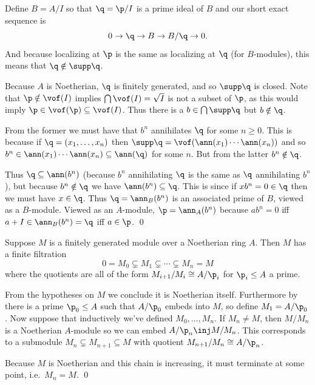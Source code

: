     Define $B=A/I$ so that $\q=\p/I$ is a prime ideal of $B$ and our short exact sequence is
    $$ 0 \to \q \to B \to B/\q \to 0 . $$
    And because localizing at $\p$ is the same as localizing at $\q$ (for $B$-modules), this means that $\q\notin\supp\q$.

    Because $A$ is Noetherian, $\q$ is finitely generated, and so $\supp\q$ is closed.
    Note that $\p\notin\vof(I)$ implies $\bigcap\vof(I)=\sqrt I$ is not a subset of $\p$, as this would imply $\p\in\vof(\p)\subseteq\vof(I)$.
    Thus there is a $b\in\bigcap\supp\q$ but $b\notin\q$.

    From the former we must have that $b^n$ annihilates $\q$ for some $n\geq0$.
    This is because if $\q=(x_1,\dots,x_n)$ then $\supp\q=\vof(\ann(x_1)\cdots\ann(x_n))$ and so $b^n\in\ann(x_1)\cdots\ann(x_n)\subseteq\ann(\q)$ for some $n$.
    But from the latter $b^n\notin\q$.

    Thus $\q\subseteq\ann(b^n)$ (because $b^n$ annihilating $\q$ is the same as $\q$ annihilating $b^n$), but because $b^n\notin\q$ we have $\ann(b^n)\subseteq\q$.
    This is since if $xb^n=0\in\q$ then we must have $x\in\q$.
    Thus $\q=\ann_B(b^n)$ is an associated prime of $B$, viewed as a $B$-module.
    Viewed as an $A$-module, $\p=\ann_A(b^n)$ because $ab^n=0$ iff $a+I\in\ann_B(b^n)=\q$ iff $a\in\p$.
    \qed

\eproof

\blemm

    Suppose $M$ is a finitely generated module over a Noetherian ring $A$.
    Then $M$ has a finite filtration
    $$ 0 = M_0 \subsetneq M_1 \subsetneq \cdots \subsetneq M_n = M $$
    where the quotients are all of the form $M_{i+1}/M_i\cong A/\p_i$ for $\p_i\leq A$ a prime.

\elemm

\bproof

    From the hypotheses on $M$ we conclude it is Noetherian itself.
    Furthermore by  there is a prime $\p_0\leq A$ such that $A/\p_0$ embeds into $M$, so define $M_1=A/\p_0$.
    Now suppose that inductively we've defined $M_0,\dots,M_n$.
    If $M_n\neq M$, then $M/M_n$ is a Noetherian $A$-module so we can embed $A/\p_n\inj M/M_n$.
    This corresponds to a submodule $M_n\subsetneq M_{n+1}\subseteq M$ with quotient $M_{n+1}/M_n\cong A/\p_n$.

    Because $M$ is Noetherian and this chain is increasing, it must terminate at some point, i.e.\ $M_n=M$.
    \qed

